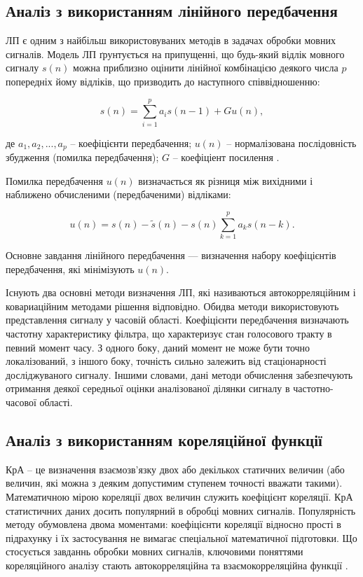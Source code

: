 \subsection{Аналіз з використанням лінійного передбачення}

ЛП є одним з найбільш використовуваних методів в задачах обробки мовних сигналів. Модель ЛП ґрунтується на припущенні, що будь-який відлік мовного сигналу $s(n)$ можна приблизно оцінити лінійної комбінацією деякого числа $p$ попередніх йому відліків, що призводить до наступного співвідношенню:

\begin{equation}
\label{eq:equation8}
s(n)=\sum_{i=1}^{p}a_is(n-1)+Gu(n),
\end{equation}

\noindent
де $a_1,a_2,...,a_p$ – коефіцієнти передбачення; $u(n)$ – нормалізована послідовність збудження (помилка передбачення); $G$ – коефіціент посилення \cite{Любимов_1995}.

Помилка передбачення $u(n)$ визначається як різниця між вихідними і наближено обчисленими (передбаченими) відліками:

\begin{equation}
\label{eq:equation9}
u(n)=s(n)-\tilde{s}(n)-s(n)\sum_{k=1}^p a_ks(n-k).
\end{equation}

Основне завдання лінійного передбачення --- визначення набору коефіцієнтів передбачення, які мінімізують $u(n)$.

Існують два основні методи визначення ЛП, які називаються автокорреляційним і ковариаційним методами рішення відповідно. Обидва методи використовують представлення сигналу у часовій області. Коефіцієнти передбачення визначають частотну характеристику фільтра, що характеризує стан голосового тракту в певний момент часу. З одного боку, даний момент не може бути точно локалізований, з іншого боку, точність сильно залежить від стаціонарності досліджуваного сигналу. Іншими словами, дані методи обчислення забезпечують отримання деякої середньої оцінки аналізованої ділянки сигналу в частотно-часової області.

\subsection{Аналіз з використанням кореляційної функції}

КрА – це визначення взаємозв'язку двох або декількох статичних величин (або величин, які можна з деяким допустимим ступенем точності вважати такими). Математичною мірою кореляції двох величин служить коефіцієнт кореляції. КрА статистичних даних досить популярний в обробці мовних сигналів. Популярність методу обумовлена ​​двома моментами: коефіцієнти кореляції відносно прості в підрахунку і їх застосування не вимагає спеціальної математичної підготовки. Що стосується завданнь обробки мовних сигналів, ключовими поняттями кореляційного аналізу стають автокорреляційна та взаємокорреляційна функції \cite{Баскаков_2001}.

